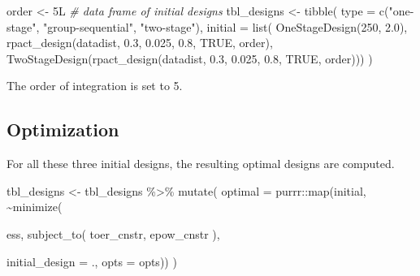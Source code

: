 \documentclass[
]{book}
\newenvironment{Shaded}{\begin{snugshade}}{\end{snugshade}}
\newcommand{\AttributeTok}[1]{\textcolor[rgb]{0.77,0.63,0.00}{#1}}
\newcommand{\CommentTok}[1]{\textcolor[rgb]{0.56,0.35,0.01}{\textit{#1}}}
\newcommand{\ConstantTok}[1]{\textcolor[rgb]{0.00,0.00,0.00}{#1}}
\newcommand{\DecValTok}[1]{\textcolor[rgb]{0.00,0.00,0.81}{#1}}
\newcommand{\FloatTok}[1]{\textcolor[rgb]{0.00,0.00,0.81}{#1}}
\newcommand{\FunctionTok}[1]{\textcolor[rgb]{0.00,0.00,0.00}{#1}}
\newcommand{\NormalTok}[1]{#1}
\newcommand{\OtherTok}[1]{\textcolor[rgb]{0.56,0.35,0.01}{#1}}
\newcommand{\SpecialCharTok}[1]{\textcolor[rgb]{0.00,0.00,0.00}{#1}}
\newcommand{\StringTok}[1]{\textcolor[rgb]{0.31,0.60,0.02}{#1}}
\begin{document}
\begin{Shaded}
\begin{Highlighting}[]
\NormalTok{order }\OtherTok{\textless{}{-}}\NormalTok{ 5L}
\CommentTok{\# data frame of initial designs }
\NormalTok{tbl\_designs }\OtherTok{\textless{}{-}} \FunctionTok{tibble}\NormalTok{(}
    \AttributeTok{type    =} \FunctionTok{c}\NormalTok{(}\StringTok{"one{-}stage"}\NormalTok{, }\StringTok{"group{-}sequential"}\NormalTok{, }\StringTok{"two{-}stage"}\NormalTok{),}
    \AttributeTok{initial =} \FunctionTok{list}\NormalTok{(}
        \FunctionTok{OneStageDesign}\NormalTok{(}\DecValTok{250}\NormalTok{, }\FloatTok{2.0}\NormalTok{),}
        \FunctionTok{rpact\_design}\NormalTok{(datadist, }\FloatTok{0.3}\NormalTok{, }\FloatTok{0.025}\NormalTok{, }\FloatTok{0.8}\NormalTok{, }\ConstantTok{TRUE}\NormalTok{, order),}
        \FunctionTok{TwoStageDesign}\NormalTok{(}\FunctionTok{rpact\_design}\NormalTok{(datadist, }\FloatTok{0.3}\NormalTok{, }\FloatTok{0.025}\NormalTok{, }\FloatTok{0.8}\NormalTok{, }\ConstantTok{TRUE}\NormalTok{, order))) )}
\end{Highlighting}
\end{Shaded}

The order of integration is set to 5.

\hypertarget{optimization-3}{%
\subsection{Optimization}\label{optimization-3}}

For all these three initial designs, the resulting optimal designs are
computed.

\begin{Shaded}
\begin{Highlighting}[]
\NormalTok{tbl\_designs }\OtherTok{\textless{}{-}}\NormalTok{ tbl\_designs }\SpecialCharTok{\%\textgreater{}\%} 
    \FunctionTok{mutate}\NormalTok{(}
       \AttributeTok{optimal =}\NormalTok{ purrr}\SpecialCharTok{::}\FunctionTok{map}\NormalTok{(initial, }\SpecialCharTok{\textasciitilde{}}\FunctionTok{minimize}\NormalTok{(}
         
\NormalTok{          ess,}
          \FunctionTok{subject\_to}\NormalTok{(}
\NormalTok{              toer\_cnstr,}
\NormalTok{              epow\_cnstr}
\NormalTok{          ),}
          
          \AttributeTok{initial\_design =}\NormalTok{ ., }
          \AttributeTok{opts           =}\NormalTok{ opts)) )}
\end{Highlighting}
\end{Shaded}
\end{document}
